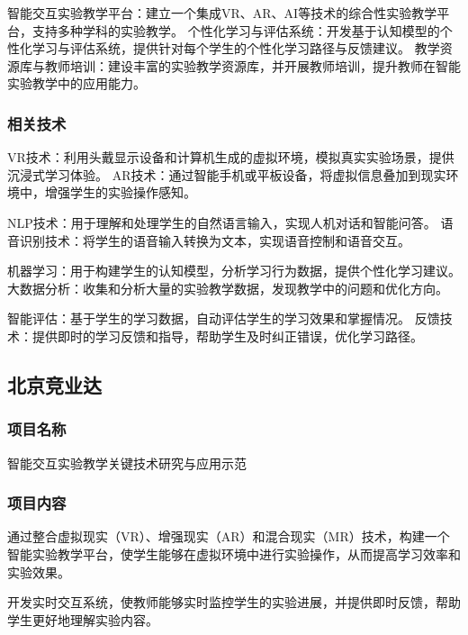 智能交互实验教学平台：建立一个集成VR、AR、AI等技术的综合性实验教学平台，支持多种学科的实验教学。
个性化学习与评估系统：开发基于认知模型的个性化学习与评估系统，提供针对每个学生的个性化学习路径与反馈建议。
教学资源库与教师培训：建设丰富的实验教学资源库，并开展教师培训，提升教师在智能实验教学中的应用能力。
\subsubsection{相关技术}

VR技术：利用头戴显示设备和计算机生成的虚拟环境，模拟真实实验场景，提供沉浸式学习体验。
AR技术：通过智能手机或平板设备，将虚拟信息叠加到现实环境中，增强学生的实验操作感知。

NLP技术：用于理解和处理学生的自然语言输入，实现人机对话和智能问答。
语音识别技术：将学生的语音输入转换为文本，实现语音控制和语音交互。

机器学习：用于构建学生的认知模型，分析学习行为数据，提供个性化学习建议。
大数据分析：收集和分析大量的实验教学数据，发现教学中的问题和优化方向。

智能评估：基于学生的学习数据，自动评估学生的学习效果和掌握情况。
反馈技术：提供即时的学习反馈和指导，帮助学生及时纠正错误，优化学习路径。

\subsection{北京竞业达}

\subsubsection{项目名称}

智能交互实验教学关键技术研究与应用示范

\subsubsection{项目内容}


通过整合虚拟现实（VR）、增强现实（AR）和混合现实（MR）技术，构建一个智能实验教学平台，使学生能够在虚拟环境中进行实验操作，从而提高学习效率和实验效果。

开发实时交互系统，使教师能够实时监控学生的实验进展，并提供即时反馈，帮助学生更好地理解实验内容。

